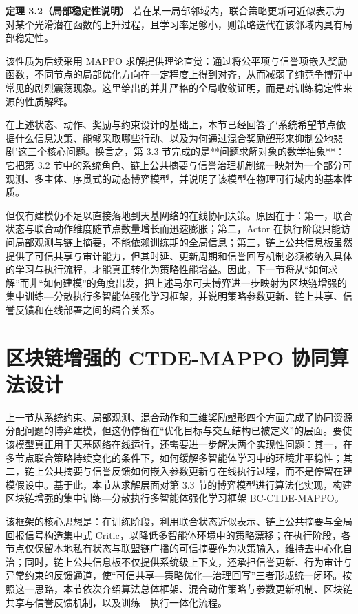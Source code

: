 \documentclass[UTF8,12pt,oneside]{ctexbook}
\begin{document}
\textbf{定理 3.2（局部稳定性说明）} 若在某一局部邻域内，联合策略更新可近似表示为对某个光滑潜在函数的上升过程，且学习率足够小，则策略迭代在该邻域内具有局部稳定性。

该性质为后续采用 MAPPO 求解提供理论直觉：通过将公平项与信誉项嵌入奖励函数，不同节点的局部优化方向在一定程度上得到对齐，从而减弱了纯竞争博弈中常见的剧烈震荡现象。这里给出的并非严格的全局收敛证明，而是对训练稳定性来源的性质解释。


在上述状态、动作、奖励与约束设计的基础上，本节已经回答了‘系统希望节点依据什么信息决策、能够采取哪些行动、以及为何通过混合奖励塑形来抑制公地悲剧’这三个核心问题。换言之，第 3.3 节完成的是**问题求解对象的数学抽象**：它把第 3.2 节中的系统角色、链上公共摘要与信誉治理机制统一映射为一个部分可观测、多主体、序贯式的动态博弈模型，并说明了该模型在物理可行域内的基本性质。

但仅有建模仍不足以直接落地到天基网络的在线协同决策。原因在于：第一，联合状态与联合动作维度随节点数量增长而迅速膨胀；第二，Actor 在执行阶段只能访问局部观测与链上摘要，不能依赖训练期的全局信息；第三，链上公共信息板虽然提供了可信共享与审计能力，但其时延、更新周期和信誉回写机制必须被纳入具体的学习与执行流程，才能真正转化为策略性能增益。因此，下一节将从“如何求解”而非“如何建模”的角度出发，把上述马尔可夫博弈进一步映射为区块链增强的集中训练—分散执行多智能体强化学习框架，并说明策略参数更新、链上共享、信誉反馈和在线部署之间的耦合关系。

\section{区块链增强的 CTDE-MAPPO 协同算法设计}

上一节从系统约束、局部观测、混合动作和三维奖励塑形四个方面完成了协同资源分配问题的博弈建模，但这仍停留在“优化目标与交互结构已被定义”的层面。要使该模型真正用于天基网络在线运行，还需要进一步解决两个实现性问题：其一，在多节点联合策略持续变化的条件下，如何缓解多智能体学习中的环境非平稳性；其二，链上公共摘要与信誉反馈如何嵌入参数更新与在线执行过程，而不是停留在建模假设中。基于此，本节从求解层面对第 3.3 节的博弈模型进行算法化实现，构建区块链增强的集中训练—分散执行多智能体强化学习框架 BC-CTDE-MAPPO。

该框架的核心思想是：在训练阶段，利用联合状态近似表示、链上公共摘要与全局回报信号构造集中式 Critic，以降低多智能体环境中的策略漂移；在执行阶段，各节点仅保留本地私有状态与联盟链广播的可信摘要作为决策输入，维持去中心化自治；同时，链上公共信息板不仅提供系统级上下文，还承担信誉更新、行为审计与异常约束的反馈通道，使“可信共享—策略优化—治理回写”三者形成统一闭环。按照这一思路，本节依次介绍算法总体框架、混合动作策略与参数更新机制、区块链共享与信誉反馈机制，以及训练—执行一体化流程。
\end{document}
